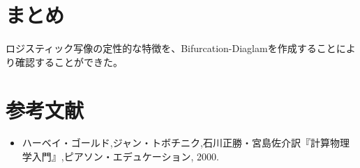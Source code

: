 \documentclass{jsarticle}
\begin{document}
\section{まとめ}
ロジスティック写像の定性的な特徴を、Bifurcation-Diaglamを作成することにより確認することができた。

\section{参考文献}
\begin{itemize}
 \item ハーベイ・ゴールド,ジャン・トボチニク,石川正勝・宮島佐介訳『計算物理学入門』,ピアソン・エデュケーション, 2000.
\end{itemize}
\end{document}
